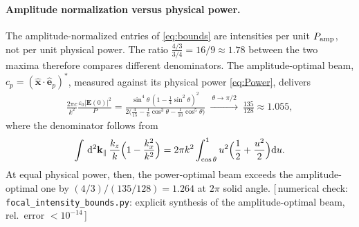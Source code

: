 \documentclass[11pt,letterpaper]{article}
\newcommand{\vect}[1]{\mathbf{#1}}
\newcommand{\Ev}{\vect{E}}
\newcommand{\kv}{\vect{k}}
\newcommand{\kp}{\kv_{\parallel}}
\newcommand{\xhat}{\hat{\vect{x}}}
\newcommand{\ep}{\hat{\vect{e}}_p}
\newcommand{\dkk}{\,{\rm d}^2\kp}
\newcommand{\code}[1]{\texttt{\small #1}}
\newcommand{\numcheck}[1]{\hfill{\small\color{green!40!black}[\,numerical check: #1\,]}}
\begin{document}
\paragraph{Amplitude normalization versus physical power.} The amplitude-normalized entries of \eqref{eq:bounds} are intensities per unit $P_{\rm amp}$, not per unit physical power. The ratio $\tfrac{4/3}{3/4}=16/9\approx1.78$ between the two maxima therefore compares different denominators. The amplitude-optimal beam, $c_p=(\xhat\cdot\ep)^*$, measured against its physical power \eqref{eq:Power}, delivers
\begin{align}
    \frac{2\pi c}{k^2}\frac{\varepsilon_0|\Ev(0)|^2}{P}
    = \frac{\sin^4\theta\,(1-\tfrac14\sin^2\theta)^2}{2\big(\tfrac4{15}-\tfrac16\cos^3\theta-\tfrac1{10}\cos^5\theta\big)}
    \ \xrightarrow{\ \theta\to\pi/2\ }\ \frac{135}{128}\approx1.055,
    \label{eq:ampTrue}
\end{align}
where the denominator follows from
\begin{align*}
\int\dkk\,\frac{k_z}{k}\Big(1-\frac{k_x^2}{k^2}\Big)=2\pi k^2\int_{\cos\theta}^{1}u^2\Big(\frac12+\frac{u^2}2\Big){\rm d}u.
\end{align*}
At equal physical power, then, the power-optimal beam exceeds the amplitude-optimal one by $(4/3)/(135/128)=1.264$ at $2\pi$ solid angle.
\numcheck{\code{focal\_intensity\_bounds.py}: explicit synthesis of the amplitude-optimal beam, rel.\ error $<10^{-14}$}
\end{document}

